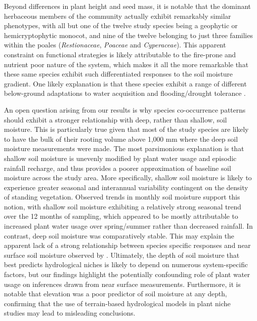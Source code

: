 Beyond differences in plant height and seed mass, it is notable that the dominant herbaceous members of the community actually exhibit remarkably similar phenotypes, with all but one of the twelve study species being a geophytic or hemicryptophytic monocot, and nine of the twelve belonging to just three families within the poales (\textit{Restionaceae}, \textit{Poaceae} and \textit{Cyperaceae}). This apparent constraint on functional strategies is likely attributable to the fire-prone and nutrient poor nature of the system, which makes it all the more remarkable that these same species exhibit such differentiated responses to the soil moisture gradient. One likely explanation is that these species exhibit a range of different below-ground adaptations to water acquisition and flooding/drought tolerance \citep{Silvertown2015}. 

An open question arising from our results is why species co-occurrence patterns should exhibit a stronger relationship with deep, rather than shallow, soil moisture. This is particularly true given that most of the study species are likely to have the bulk of their rooting volume above 1,000 mm where the deep soil moisture measurements were made. The most parsimonious explanation is that shallow soil moisture is unevenly modified by plant water usage and episodic rainfall recharge, and thus provides a poorer approximation of baseline soil moisture across the study area. More specifically, shallow soil moisture is likely to experience greater seasonal and interannual variability contingent on the density of standing vegetation. Observed trends in monthly soil moisture support this notion, with shallow soil moisture exhibiting a relatively strong seasonal trend over the 12 months of sampling, which appeared to be mostly attributable to increased plant water usage over spring/summer rather than decreased rainfall. In contrast, deep soil moisture was comparatively stable. This may explain the apparent lack of a strong relationship between species specific responses and near surface soil moisture observed by \citep{Fridley2012}. Ultimately, the depth of soil moisture that best predicts hydrological niches is likely to depend on numerous system-specific factors, but our findings highlight the potentially confounding role of plant water usage on inferences drawn from near surface measurements. Furthermore, it is notable that elevation was a poor predictor of soil moisture at any depth, confirming that the use of terrain-based hydrological models in plant niche studies may lead to misleading conclusions.

